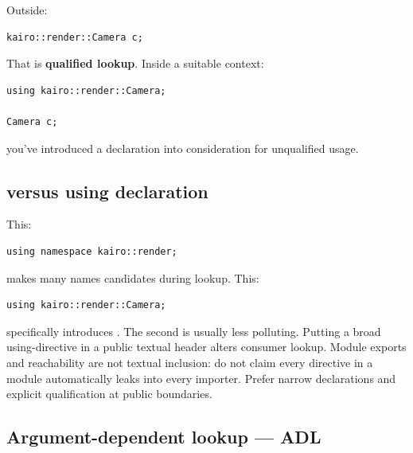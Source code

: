 Outside:

\begin{verbatim}
kairo::render::Camera c;
\end{verbatim}

That is \textbf{qualified lookup}. Inside a suitable context:

\begin{verbatim}
using kairo::render::Camera;

Camera c;
\end{verbatim}

you've introduced a declaration into consideration for unqualified usage.

\subsection{\texorpdfstring{ versus using declaration}{ versus using declaration}}\label{01-foundations-i-ch002-using-namespace-versus-using-declaration}

\hypertarget{01-foundations-i-ch002-using-namespace-versus-using-declaration}{}

This:

\begin{verbatim}
using namespace kairo::render;
\end{verbatim}

makes many names candidates during lookup. This:

\begin{verbatim}
using kairo::render::Camera;
\end{verbatim}

specifically introduces . The second is usually less polluting. Putting a broad using-directive in a public textual header alters consumer lookup. Module exports and reachability are not textual inclusion: do not claim every directive in a module automatically leaks into every importer. Prefer narrow declarations and explicit qualification at public boundaries.

\subsection{Argument-dependent lookup --- ADL}\label{01-foundations-i-ch002-argument-dependent-lookup-adl}

\hypertarget{01-foundations-i-ch002-argument-dependent-lookup-adl}{}

